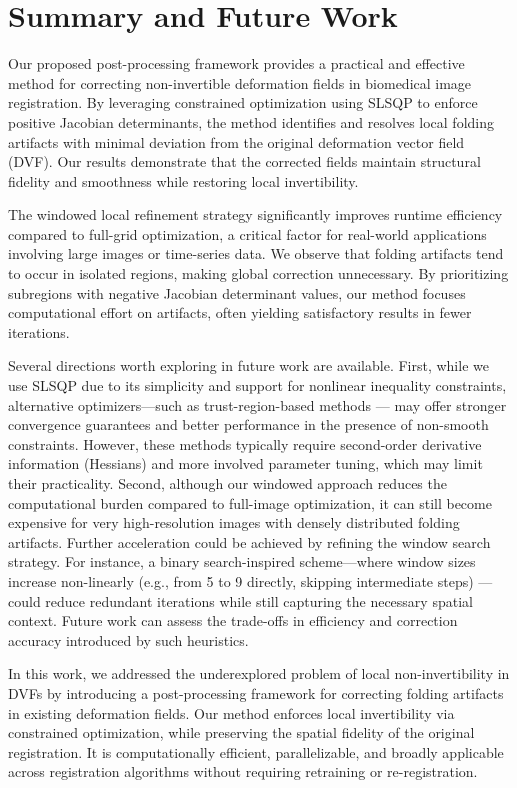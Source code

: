 \documentclass[lettersize,journal]{IEEEtran}
\begin{document}
\section{Summary and Future Work}
Our proposed post-processing framework provides a practical and effective method for correcting non-invertible deformation fields in biomedical image registration. By leveraging constrained optimization using SLSQP to enforce positive Jacobian determinants, the method identifies and resolves local folding artifacts with minimal deviation from the original deformation vector field (DVF). Our results demonstrate that the corrected fields maintain structural fidelity and smoothness while restoring local invertibility.

The windowed local refinement strategy significantly improves runtime efficiency compared to full-grid optimization, a critical factor for real-world applications involving large images or time-series data. We observe that folding artifacts tend to occur in isolated regions, making global correction unnecessary. By prioritizing subregions with negative Jacobian determinant values, our method focuses computational effort on artifacts, often yielding satisfactory results in fewer iterations. 

Several directions worth exploring in future work are available. First, while we use SLSQP due to its simplicity and support for nonlinear inequality constraints, alternative optimizers—such as trust-region-based methods \cite{Conn2000} — may offer stronger convergence guarantees and better performance in the presence of non-smooth constraints. However, these methods typically require second-order derivative information (Hessians) and more involved parameter tuning, which may limit their practicality. Second, although our windowed approach reduces the computational burden compared to full-image optimization, it can still become expensive for very high-resolution images with densely distributed folding artifacts. Further acceleration could be achieved by refining the window search strategy. For instance, a binary search-inspired scheme—where window sizes increase non-linearly (e.g., from 5 to 9 directly, skipping intermediate steps) — could reduce redundant iterations while still capturing the necessary spatial context. Future work can assess the trade-offs in efficiency and correction accuracy introduced by such heuristics.

In this work, we addressed the underexplored problem of local non-invertibility in DVFs by introducing a post-processing framework for correcting folding artifacts in existing deformation fields. Our method enforces local invertibility via constrained optimization, while preserving the spatial fidelity of the original registration. It is computationally efficient, parallelizable, and broadly applicable across registration algorithms without requiring retraining or re-registration.




\end{document}
